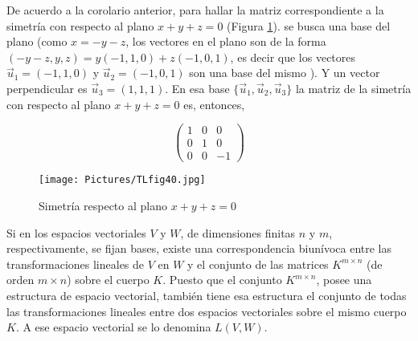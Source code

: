 \begin{example}
De acuerdo a la corolario anterior, para hallar la matriz correspondiente a la simetría con respecto al plano $x+y+z=0$ (Figura \ref{TLfig300}). se busca una base del plano (como $x=-y-z$, los vectores en el plano son de la forma $(-y-z,y,z)=y(-1,1,0)+z(-1,0,1)$, es decir que  los vectores $\vec{u}_1=( -1,1,0)$  y $\vec{u}_2=( -1,0,1)$ son una base del mismo ). Y un vector perpendicular es  $\vec{u}_3=( 1,1,1)$.
En esa  base $\{ \vec{u}_1, \vec{u}_2, \vec{u}_3\} $ la matriz de la simetría con respecto al plano $x+y+z=0$ es, 
entonces,  

$$\left(\begin{array}{ccc} 1 & 0 &  0\\
0 &  1  &  0\\
0 &  0  &  -1
\end{array}\right)$$
\end{example}

\bigskip

\begin{figure}
    \centering
    \texttt{[image: Pictures/TLfig40.jpg]}
    \caption{Simetría respecto al plano $x+y+z=0$ }
    \label{TLfig300}
\end{figure}

\bigskip

\bigskip

Si en los espacios vectoriales $V$ y $W$, de dimensiones finitas $n$ y $m$, respectivamente, se fijan bases, existe una correspondencia biunívoca entre las transformaciones lineales de $V$ en $W$ y el conjunto de las matrices $K^{m \times n}$ (de orden $m \times n$) sobre el cuerpo $K$. Puesto que el conjunto $K^{m \times n}$, posee una estructura de espacio vectorial, también  tiene esa estructura el conjunto de todas las transformaciones lineales entre dos espacios vectoriales sobre el mismo cuerpo $K$. A ese espacio vectorial se lo  denomina $L(V,W)$.


\bigskip









